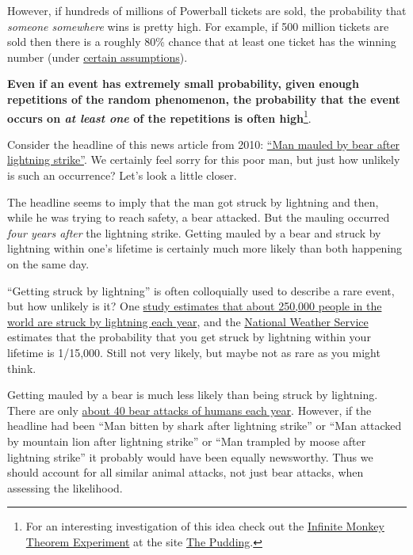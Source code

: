 \documentclass[
  letterpaper,
  DIV=11,
  numbers=noendperiod]{scrreprt}
\theoremstyle{plain}
\theoremstyle{definition}
\theoremstyle{definition}
\theoremstyle{definition}
\theoremstyle{remark}
\begin{document}
However, if hundreds of millions of Powerball tickets are sold, the
probability that \emph{someone somewhere} wins is pretty high. For
example, if 500 million tickets are sold then there is a roughly 80\%
chance that at least one ticket has the winning number (under
\href{https://fivethirtyeight.com/features/new-powerball-odds-could-give-america-its-first-billion-dollar-jackpot/}{certain
assumptions}).

\textbf{Even if an event has extremely small probability, given enough
repetitions of the random phenomenon, the probability that the event
occurs on \emph{at least one} of the repetitions is often
high}\footnote{For an interesting investigation of this idea check out
  the \href{https://pudding.cool/2020/04/infinite/}{Infinite Monkey
  Theorem Experiment} at the site \href{https://pudding.cool/}{The
  Pudding}.}.

Consider the headline of this news article from 2010:
\href{https://www.upi.com/Odd_News/2010/06/24/Man-mauled-by-bear-after-lightning-strike/22821277399823/}{``Man
mauled by bear after lightning strike''}. We certainly feel sorry for
this poor man, but just how unlikely is such an occurrence? Let's look a
little closer.

The headline seems to imply that the man got struck by lightning and
then, while he was trying to reach safety, a bear attacked. But the
mauling occurred \emph{four years after} the lightning strike. Getting
mauled by a bear and struck by lightning within one's lifetime is
certainly much more likely than both happening on the same day.

``Getting struck by lightning'' is often colloquially used to describe a
rare event, but how unlikely is it? One
\href{https://www.vaisala.com/sites/default/files/documents/Annual_rates_of_lightning_fatalities_by_country.pdf}{study
estimates that about 250,000 people in the world are struck by lightning
each year}, and the
\href{https://www.weather.gov/safety/lightning-odds}{National Weather
Service} estimates that the probability that you get struck by lightning
within your lifetime is 1/15,000. Still not very likely, but maybe not
as rare as you might think.

Getting mauled by a bear is much less likely than being struck by
lightning. There are only
\href{https://www.nature.com/articles/s41598-019-44341-w}{about 40 bear
attacks of humans each year}. However, if the headline had been ``Man
bitten by shark after lightning strike'' or ``Man attacked by mountain
lion after lightning strike'' or ``Man trampled by moose after lightning
strike'' it probably would have been equally newsworthy. Thus we should
account for all similar animal attacks, not just bear attacks, when
assessing the likelihood.
\end{document}
